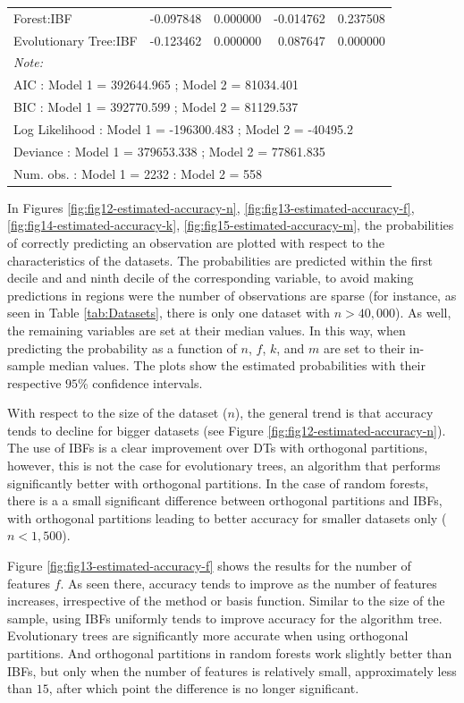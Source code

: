 \documentclass[]{elsarticle} %
\begin{document}
\begin{table}
\begin{tabular}[t]{lrrrr}
\addlinespace
Forest:IBF & -0.097848 & 0.000000 & -0.014762 & 0.237508\\
Evolutionary Tree:IBF & -0.123462 & 0.000000 & 0.087647 & 0.000000\\
\bottomrule
\multicolumn{5}{l}{\textit{Note: }}\\
\multicolumn{5}{l}{AIC : Model 1 =  392644.965 ; Model 2 =  81034.401}\\
\multicolumn{5}{l}{BIC : Model 1 =  392770.599 ; Model 2 =  81129.537}\\
\multicolumn{5}{l}{Log Likelihood : Model 1 =  -196300.483 ; Model 2 =  -40495.2}\\
\multicolumn{5}{l}{Deviance : Model 1 =  379653.338 ; Model 2 = 77861.835}\\
\multicolumn{5}{l}{Num. obs. : Model 1 =  2232 : Model 2 =  558}\\
\end{tabular}
\end{table}

In Figures \ref{fig:fig12-estimated-accuracy-n},
\ref{fig:fig13-estimated-accuracy-f},
\ref{fig:fig14-estimated-accuracy-k},
\ref{fig:fig15-estimated-accuracy-m}, the probabilities of correctly
predicting an observation are plotted with respect to the
characteristics of the datasets. The probabilities are predicted within
the first decile and and ninth decile of the corresponding variable, to
avoid making predictions in regions were the number of observations are
sparse (for instance, as seen in Table \ref{tab:Datasets}, there is only
one dataset with \(n>40,000\)). As well, the remaining variables are set
at their median values. In this way, when predicting the probability as
a function of \(n\), \(f\), \(k\), and \(m\) are set to their in-sample
median values. The plots show the estimated probabilities with their
respective \(95\)\% confidence intervals.

With respect to the size of the dataset (\(n\)), the general trend is
that accuracy tends to decline for bigger datasets (see Figure
\ref{fig:fig12-estimated-accuracy-n}). The use of IBFs is a clear
improvement over DTs with orthogonal partitions, however, this is not
the case for evolutionary trees, an algorithm that performs
significantly better with orthogonal partitions. In the case of random
forests, there is a a small significant difference between orthogonal
partitions and IBFs, with orthogonal partitions leading to better
accuracy for smaller datasets only (\(n<1,500\)).

Figure \ref{fig:fig13-estimated-accuracy-f} shows the results for the
number of features \(f\). As seen there, accuracy tends to improve as
the number of features increases, irrespective of the method or basis
function. Similar to the size of the sample, using IBFs uniformly tends
to improve accuracy for the algorithm tree. Evolutionary trees are
significantly more accurate when using orthogonal partitions. And
orthogonal partitions in random forests work slightly better than IBFs,
but only when the number of features is relatively small, approximately
less than \(15\), after which point the difference is no longer
significant.
\end{document}
